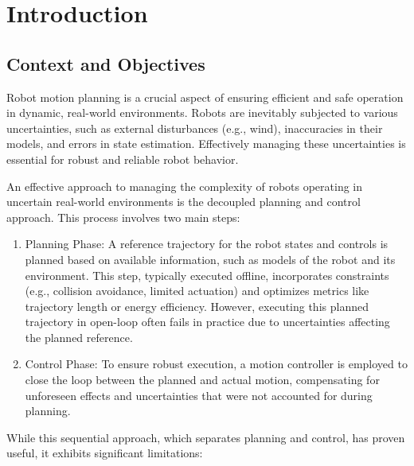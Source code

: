 \chapter{Introduction}

\section{Context and Objectives}

Robot motion planning is a crucial aspect of ensuring efficient and safe operation in dynamic, real-world environments. 
Robots are inevitably subjected to various uncertainties, such as external disturbances (e.g., wind), inaccuracies in their models, and errors in state estimation. 
Effectively managing these uncertainties is essential for robust and reliable robot behavior.

An effective approach to managing the complexity of robots operating in uncertain real-world environments is the decoupled planning and control approach. 
This process involves two main steps:

\begin{enumerate}
  \item Planning Phase: A reference trajectory for the robot states and controls is planned based on available information, such as models of the robot and its environment.
  This step, typically executed offline, incorporates constraints (e.g., collision avoidance, limited actuation) and optimizes metrics like trajectory length or energy efficiency. 
  However, executing this planned trajectory in open-loop often fails in practice due to uncertainties affecting the planned reference.
  \item Control Phase: To ensure robust execution, a motion controller is employed to close the loop between the planned and actual motion, compensating for unforeseen effects and uncertainties that were not accounted for during planning.
\end{enumerate}
    
While this sequential approach, which separates planning and control, has proven useful, it exhibits significant limitations:

